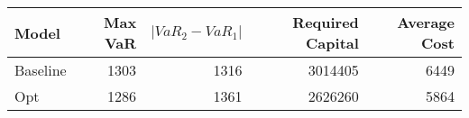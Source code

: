 \begin{tabular}{lrrrr}
\toprule
    Model &  Max VaR &  $|VaR_2 - VaR_1|$ &  Required Capital &  Average Cost \\
\midrule
 Baseline &     1303 &               1316 &           3014405 &          6449 \\
      Opt &     1286 &               1361 &           2626260 &          5864 \\
\bottomrule
\end{tabular}

